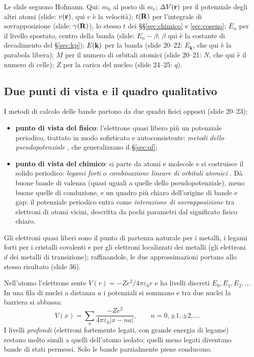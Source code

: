 \documentclass[11pt,a4paper]{article}
\begin{document}
\begin{osservazione}[notazione]
Le slide seguono Hofmann. Qui: $m_0$ al posto di $m_e$; $\Delta V(\mathbf r)$ per il potenziale degli altri atomi (slide: $v(\mathbf r)$, qui $v$ è la
velocità); $t(\mathbf R)$ per l'integrale di sovrapposizione (slide: $\gamma(\mathbf R)$), lo stesso $t$ dei §§\ref{sec:chimico} e \ref{sec:coseno};
$\bar E_n$ per il livello spostato, centro della banda (slide: $E_n-\beta$; $\beta$ qui è la costante di decadimento del §\ref{sec:kp}); $E(\mathbf k)$
per la banda (slide 20--22: $E_{\mathbf k}$, che qui è la parabola libera); $M$ per il numero di orbitali atomici (slide 20--21: $N$, che qui è il
numero di celle); $Z$ per la carica del nucleo (slide 24--25: $q$).
\end{osservazione}

\subsection{Due punti di vista e il quadro qualitativo}\label{sec:tbqual}
I metodi di calcolo delle bande partono da due quadri fisici opposti (slide 20--23):
\begin{itemize}[leftmargin=*]
\item \textbf{punto di vista del fisico}: l'elettrone quasi libero più un potenziale periodico, trattato in modo sofisticato e autoconsistente:
\emph{metodi dello pseudopotenziale} , che generalizzano il §\ref{sec:qf};
\item \textbf{punto di vista del chimico}: si parte da atomi e molecole e si costruisce il solido periodico: \emph{legami forti}  o \emph{combinazione lineare di orbitali atomici} . Dà buone bande di valenza (quasi uguali a quelle dello pseudopotenziale),
meno buone quelle di conduzione, e un quadro più chiaro dell'origine di bande e gap: il potenziale periodico entra come \emph{interazione di
sovrapposizione} tra elettroni di atomi vicini, descritta da pochi parametri dal significato fisico chiaro.
\end{itemize}
Gli elettroni quasi liberi sono il punto di partenza naturale per i metalli, i legami forti per i cristalli covalenti e per gli elettroni
localizzati dei metalli (gli elettroni $d$ dei metalli di transizione); raffinandole, le due approssimazioni portano allo stesso risultato (slide 36).

Nell'atomo l'elettrone sente $V(r)=-Ze^2/4\pi\varepsilon_0r$ e ha livelli discreti $E_0,E_1,E_2,\dots$ In una fila di nuclei a distanza $a$ i
potenziali si sommano e tra due nuclei la barriera si abbassa:
\[
V(x)=\sum_n\frac{-Ze^2}{4\pi\varepsilon_0|x-na|},\qquad n=0,\pm1,\pm2,\dots
\]
I livelli \emph{profondi} (elettroni fortemente legati, con grande energia di legame) restano molto simili a quelli dell'atomo isolato; quelli meno
legati diventano bande di stati permessi. Solo le bande parzialmente piene conducono.
\end{document}
